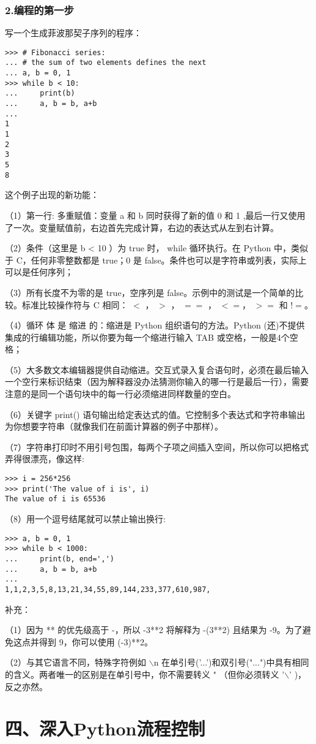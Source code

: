 \documentclass{article}
\begin{document}
\begin{CJK}{UTF8}{gbsn}
\section*{2.编程的第一步}
写一个生成菲波那契子序列的程序：
\begin{verbatim}
>>> # Fibonacci series:
... # the sum of two elements defines the next
... a, b = 0, 1
>>> while b < 10:
...     print(b)
...     a, b = b, a+b
...
1
1
2
3
5
8
\end{verbatim}
这个例子出现的新功能：
\subparagraph*{}
（1）第一行: 多重赋值：变量 a 和 b 同时获得了新的值 0 和 1 ,最后一行又使用了一次。变量赋值前，右边首先完成计算，右边的表达式从左到右计算。
\subparagraph*{}
（2）条件（这里是 b < 10 ）为 true 时， while 循环执行。在 Python 中，类似于 C，任何非零整数都是 true；0 是 false。条件也可以是字符串或列表，实际上可以是任何序列；
\subparagraph*{}
（3）所有长度不为零的是 true，空序列是 false。示例中的测试是一个简单的比较。标准比较操作符与 C 相同： $<$ ， $>$ ， $==$ ， $<=$， $>=$ 和 $!=$。
\subparagraph*{}
（4）循环 体 是 缩进 的：缩进是 Python 组织语句的方法。Python (还)不提供集成的行编辑功能，所以你要为每一个缩进行输入 TAB 或空格，一般是4个空格；
\subparagraph*{}
（5）大多数文本编辑器提供自动缩进。交互式录入复合语句时，必须在最后输入一个空行来标识结束（因为解释器没办法猜测你输入的哪一行是最后一行），需要注意的是同一个语句块中的每一行必须缩进同样数量的空白。
\subparagraph*{}
（6）关键字 print() 语句输出给定表达式的值。它控制多个表达式和字符串输出为你想要字符串（就像我们在前面计算器的例子中那样）。
\subparagraph*{}
（7）字符串打印时不用引号包围，每两个子项之间插入空间，所以你可以把格式弄得很漂亮，像这样:
\begin{verbatim}
>>> i = 256*256
>>> print('The value of i is', i)
The value of i is 65536
\end{verbatim}
\subparagraph*{}
（8）用一个逗号结尾就可以禁止输出换行:
\begin{verbatim}
>>> a, b = 0, 1
>>> while b < 1000:
...     print(b, end=',')
...     a, b = b, a+b
...
1,1,2,3,5,8,13,21,34,55,89,144,233,377,610,987,
\end{verbatim}
\subparagraph*{}
补充：
\subparagraph*{}
（1）因为 ** 的优先级高于 -，所以 -3**2 将解释为 -(3**2) 且结果为 -9。为了避免这点并得到 9，你可以使用 (-3)**2。
\subparagraph*{}
（2）与其它语言不同，特殊字符例如 $\backslash$n 在单引号('...')和双引号("...")中具有相同的含义。两者唯一的区别是在单引号中，你不需要转义 " （但你必须转义 '$\backslash$' )，反之亦然。
\part*{四、深入Python流程控制}

\end{CJK}
\end{document}
